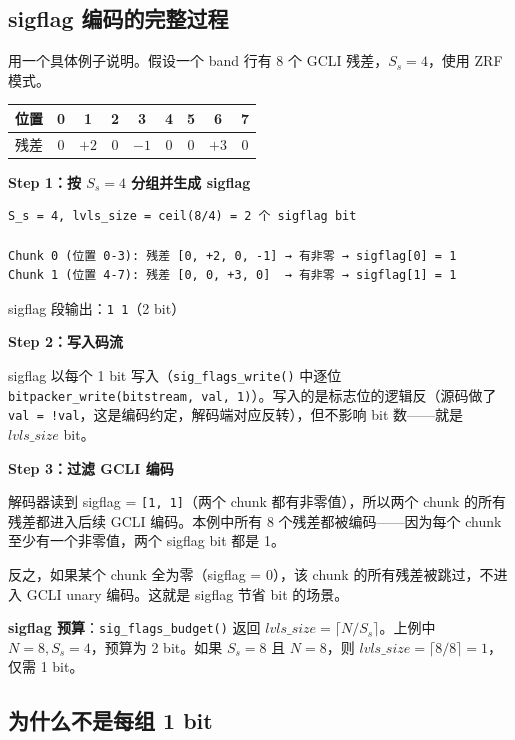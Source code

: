 \subsection{sigflag 编码的完整过程}

用一个具体例子说明。假设一个 band 行有 8 个 GCLI 残差，$S_s = 4$，使用 ZRF 模式。

\begin{center}
\small
\begin{tabular}{@{}ccccccccc@{}}
\toprule
位置 & 0 & 1 & 2 & 3 & 4 & 5 & 6 & 7 \\
\midrule
残差 & $0$ & $+2$ & $0$ & $-1$ & $0$ & $0$ & $+3$ & $0$ \\
\bottomrule
\end{tabular}
\end{center}

\textbf{Step 1：按 $S_s = 4$ 分组并生成 sigflag}

\begin{lstlisting}[numbers=none]
S_s = 4, lvls_size = ceil(8/4) = 2 个 sigflag bit

Chunk 0 (位置 0-3): 残差 [0, +2, 0, -1] → 有非零 → sigflag[0] = 1
Chunk 1 (位置 4-7): 残差 [0, 0, +3, 0]  → 有非零 → sigflag[1] = 1
\end{lstlisting}

sigflag 段输出：\texttt{1 1}（2 bit）

\textbf{Step 2：写入码流}

sigflag 以每个 1 bit 写入（\texttt{sig\_flags\_write()} 中逐位 \texttt{bitpacker\_write(bitstream, val, 1)}）。写入的是标志位的逻辑反（源码做了 \texttt{val = !val}，这是编码约定，解码端对应反转），但不影响 bit 数——就是 $\mathit{lvls\_size}$ bit。

\textbf{Step 3：过滤 GCLI 编码}

解码器读到 sigflag = \texttt{[1, 1]}（两个 chunk 都有非零值），所以两个 chunk 的所有残差都进入后续 GCLI 编码。本例中所有 8 个残差都被编码——因为每个 chunk 至少有一个非零值，两个 sigflag bit 都是 1。

反之，如果某个 chunk 全为零（sigflag = 0），该 chunk 的所有残差被跳过，不进入 GCLI unary 编码。这就是 sigflag 节省 bit 的场景。

\textbf{sigflag 预算}：\texttt{sig\_flags\_budget()} 返回 $\mathit{lvls\_size} = \lceil N / S_s \rceil$。上例中 $N = 8, S_s = 4$，预算为 2 bit。如果 $S_s = 8$ 且 $N = 8$，则 $\mathit{lvls\_size} = \lceil 8/8 \rceil = 1$，仅需 1 bit。

\subsection{为什么不是每组 1 bit}


